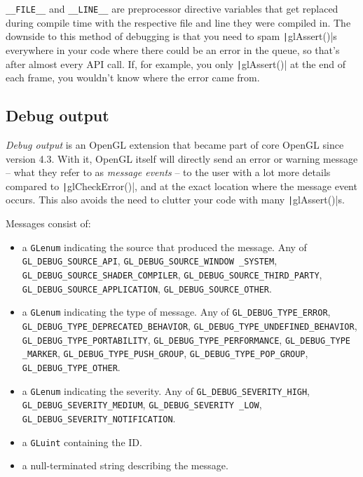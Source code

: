 \documentclass[table, xcdraw]{article}%
\begin{document}
\texttt{__FILE__} and \texttt{__LINE__} are preprocessor directive variables that get replaced during compile time with the respective file and line they were compiled in. The downside to this method of debugging is that you need to spam \texttt|glAssert()|s everywhere in your code where there could be an error in the queue, so that's after almost every API call. If, for example, you only \texttt|glAssert()| at the end of each frame, you wouldn't know where the error came from.

\subsection{Debug output}
    
\emph{Debug output} is an OpenGL extension that became part of core OpenGL since version 4.3. With it, OpenGL itself will directly send an error or warning message -- what they refer to as \emph{message events} -- to the user with a lot more details compared to \texttt|glCheckError()|, and at the exact location where the message event occurs. This also avoids the need to clutter your code with many \texttt|glAssert()|s.

Messages consist of:

\begin{itemize}
    \item a \texttt{GLenum} indicating the source that produced the message. Any of \texttt{GL_DEBUG_SOURCE_API}, \texttt{GL_DEBUG_SOURCE_WINDOW _SYSTEM}, \texttt{GL_DEBUG_SOURCE_SHADER_COMPILER}, \texttt{GL_DEBUG_SOURCE_THIRD_PARTY}, \texttt{GL_DEBUG_SOURCE_APPLICATION}, \texttt{GL_DEBUG_SOURCE_OTHER}.
    \item a \texttt{GLenum} indicating the type of message. Any of \texttt{GL_DEBUG_TYPE_ERROR}, \texttt{GL_DEBUG_TYPE_DEPRECATED_BEHAVIOR}, \texttt{GL_DEBUG_TYPE_UNDEFINED_BEHAVIOR}, \texttt{GL_DEBUG_TYPE_PORTABILITY}, \texttt{GL_DEBUG_TYPE_PERFORMANCE}, \texttt{GL_DEBUG_TYPE _MARKER}, \texttt{GL_DEBUG_TYPE_PUSH_GROUP}, \texttt{GL_DEBUG_TYPE_POP_GROUP}, \texttt{GL_DEBUG_TYPE_OTHER}.
    \item a \texttt{GLenum} indicating the severity. Any of \texttt{GL_DEBUG_SEVERITY_HIGH}, \texttt{GL_DEBUG_SEVERITY_MEDIUM}, \texttt{GL_DEBUG_SEVERITY _LOW}, \texttt{GL_DEBUG_SEVERITY_NOTIFICATION}.
    \item a \texttt{GLuint} containing the ID.
    \item a null-terminated string describing the message.
\end{itemize}
\end{document}
